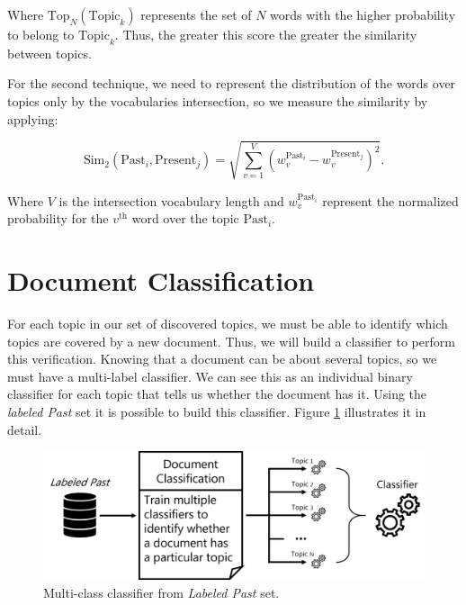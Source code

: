 Where $\text{Top}_{N}(\text{Topic}_{k})$ represents the set of $N$ words with the higher probability to belong to $\text{Topic}_{k}$. Thus, the greater this score the greater the similarity between topics.

For the second technique, we need to represent the distribution of the words over topics only by the vocabularies intersection, so we measure the similarity by applying:

\begin{equation}
	\label{eq:global-match}
	\text{Sim}_{2}\left(\text{Past}_{i}, \text{Present}_{j}\right) = \sqrt{\sum_{v=1}^{V} \left(w_{v}^{\text{Past}_{i}} - w_{v}^{\text{Present}_{j}}\right)^2} \text{.}
\end{equation}

Where $V$ is the intersection vocabulary length and $w_{v}^{\text{Past}_{i}}$ represent the normalized probability for the $v^{\text{th}}$ word over the topic $\text{Past}_{i}$.

\section{Document Classification}

For each topic in our set of discovered topics, we must be able to identify which topics are covered by a new document. Thus, we will build a classifier to perform this verification. Knowing that a document can be about several topics, so we must have a multi-label classifier. We can see this as an individual binary classifier for each topic that tells us whether the document has it. Using the \textit{labeled Past} set it is possible to build this classifier. Figure \ref{fig:document-classification} illustrates it in detail.

\begin{figure}[h!]
	\centering
	\includegraphics[width=0.9\linewidth]{01.Chapters/04.Materials/document-classification}
	\caption{Multi-class classifier from \textit{Labeled Past} set.}
	\label{fig:document-classification}
\end{figure}

